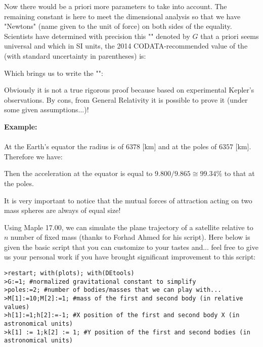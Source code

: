 	Now there would be a priori more parameters to take into account. The remaining constant is here to meet the dimensional analysis so that we have "Newtons" (name given to the unit of force) on both sides of the equality. Scientists have determined with precision this "" denoted by $G$ that a priori seems universal and which in SI units, the 2014 CODATA-recommended value of the (with standard uncertainty in parentheses) is:
	
	Which brings us to write the "":
	
	Obviously it is not a true rigorous proof because based on experimental Kepler's observations. By cons, from General Relativity it is possible to prove it (under some given assumptions...)!
	\begin{tcolorbox}[colframe=black,colback=white,sharp corners]
	\textbf{{\Large {}}Example:}\\\\
	At the Earth's equator the radius is of $6378$ [km] and at the poles of $6357$ [km]. Therefore we have:
	
	Then the acceleration at the equator is equal to $9.800/9.865\cong 99.34 \%$ to that at the poles.
	\end{tcolorbox}
	It is very important to notice that the mutual forces of attraction acting on two mass spheres are always of equal size!
	
	Using Maple 17.00, we can simulate the plane trajectory of a satellite relative to $n$ number of fixed mass (thanks to Forhad Ahmed for his script). Here below is given the basic script that you can customize to your tastes and... feel free to give us your personal work if you have brought significant improvement to this script:
	
	\texttt{>restart; with(plots); with(DEtools)\\
	>G:=1; \#normalized gravitational constant to simplify\\
	>poles:=2; \#number of bodies/masses that we can play with...\\
	>M[1]:=10;M[2]:=1; \#mass of the first and second body (in relative values)\\
	>h[1]:=1;h[2]:=-1; \#X position of the first and second body X (in astronomical units)\\
	>k[1] := 1;k[2] := 1; \#Y position of the first and second bodies (in astronomical units)\\}
	
